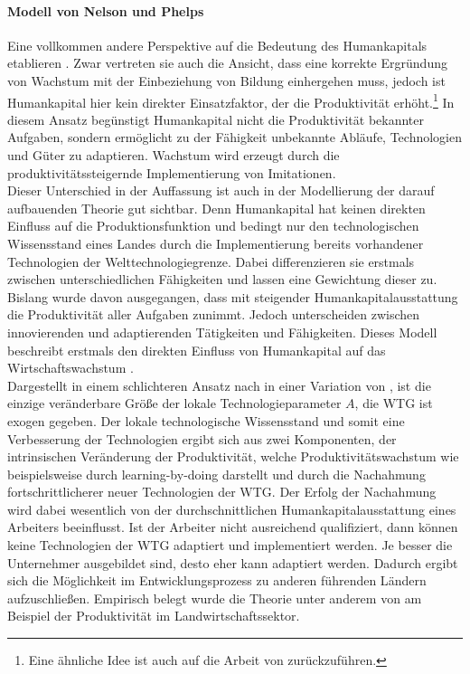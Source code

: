 \paragraph{Modell von Nelson und Phelps}
Eine vollkommen andere Perspektive auf die Bedeutung des Humankapitals etablieren \citet{ Nelson.1966}. Zwar vertreten sie auch die Ansicht, dass eine korrekte Ergr{\"u}ndung von Wachstum mit der Einbeziehung von Bildung einhergehen muss, jedoch ist Humankapital  hier kein direkter Einsatzfaktor, der die Produktivität erhöht.\footnote{Eine ähnliche Idee ist auch auf die Arbeit von \citet{Schultz.1964,Schultz.1975} zurückzuführen.} In diesem Ansatz begünstigt Humankapital nicht die Produktivit{\"a}t bekannter Aufgaben, sondern erm{\"o}glicht zu der F{\"a}higkeit unbekannte Abl{\"a}ufe, Technologien und G{\"u}ter zu adaptieren. Wachstum wird erzeugt durch die produktivit{\"a}tssteigernde Implementierung von Imitationen. \\
Dieser Unterschied in der Auffassung ist auch in der Modellierung der darauf aufbauenden Theorie gut sichtbar. Denn Humankapital hat keinen direkten Einfluss auf die Produktionsfunktion und bedingt nur den technologischen Wissensstand eines Landes durch die Implementierung bereits vorhandener Technologien der Welttechnologiegrenze. Dabei differenzieren sie erstmals zwischen unterschiedlichen Fähigkeiten und lassen eine Gewichtung dieser zu. Bislang wurde davon ausgegangen, dass mit steigender Humankapitalausstattung die Produktivität aller Aufgaben zunimmt. Jedoch unterscheiden \citet{Nelson.1966} zwischen innovierenden und adaptierenden Tätigkeiten und Fähigkeiten. 
Dieses Modell beschreibt erstmals den direkten Einfluss von Humankapital auf das Wirtschaftswachstum \citep{Nelson.1966}.\\
Dargestellt in einem schlichteren Ansatz nach \citet{Nelson.1966} in einer Variation von \citet[Kapitel 10]{Acemoglu.2009}, ist die einzige ver{\"a}nderbare Gr{\"o}{\ss}e der lokale Technologieparameter $A$, die WTG ist exogen gegeben. Der lokale technologische Wissensstand und somit eine Verbesserung der Technologien ergibt sich aus zwei Komponenten, der intrinsischen Ver{\"a}nderung der Produktivit{\"a}t, welche Produktivitätswachstum wie beispielsweise durch learning-by-doing darstellt und durch die Nachahmung fortschrittlicherer neuer Technologien der WTG. Der Erfolg der Nachahmung wird dabei wesentlich von der durchschnittlichen Humankapitalausstattung eines Arbeiters beeinflusst. Ist der Arbeiter nicht ausreichend qualifiziert, dann k{\"o}nnen keine Technologien der WTG adaptiert und implementiert werden. Je besser die Unternehmer ausgebildet sind, desto eher kann adaptiert werden. Dadurch ergibt sich die M{\"o}glichkeit im Entwicklungsprozess zu anderen f{\"u}hrenden L{\"a}ndern aufzuschlie{\ss}en. Empirisch belegt wurde die Theorie unter anderem von \citet{Foster.1995} am Beispiel der Produktivit{\"a}t im Landwirtschaftssektor.



